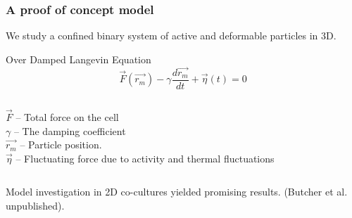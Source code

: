 \documentclass{beamer}
\begin{document}
  \begin{frame}
    \frametitle{A proof of concept model}
    
    We study a confined binary system of active and deformable particles in 3D.
        
  \begin{exampleblock}{Over Damped Langevin Equation}
	  $$\vec{F}(\vec{r _m}) - \gamma \frac{d\vec{r_m}}{dt} + \vec{\eta}(t) = 0$$
	\end{exampleblock}
	\begin{columns}[t]
      $\vec{F}$ -- Total force on the cell \\
      $\gamma$ -- The damping coefficient \\
      $\vec{r_m}$ -- Particle position. \\
      $\vec{\eta}$ -- Fluctuating force due to activity and thermal fluctuations \\
  \end{columns}

  \vfill
    
  Model investigation in 2D co-cultures yielded promising results. (Butcher et al. unpublished).

  \end{frame}
\end{document}
